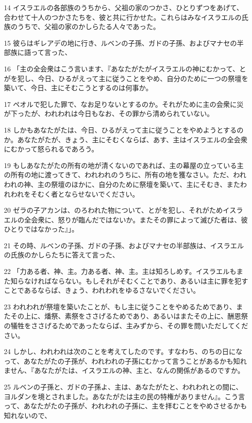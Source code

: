 \par 14 イスラエルの各部族のうちから、父祖の家のつかさ、ひとりずつをあげて、合わせて十人のつかさたちを、彼と共に行かせた。これらはみなイスラエルの氏族のうちで、父祖の家のかしらたる人々であった。
\par 15 彼らはギレアデの地に行き、ルベンの子孫、ガドの子孫、およびマナセの半部族に語って言った、
\par 16 「主の全会衆はこう言います、『あなたがたがイスラエルの神にむかって、とがを犯し、今日、ひるがえって主に従うことをやめ、自分のために一つの祭壇を築いて、今日、主にそむこうとするのは何事か。
\par 17 ペオルで犯した罪で、なお足りないとするのか。それがために主の会衆に災が下ったが、われわれは今日もなお、その罪から清められていない。
\par 18 しかもあなたがたは、今日、ひるがえって主に従うことをやめようとするのか。あなたがたが、きょう、主にそむくならば、あす、主はイスラエルの全会衆にむかって怒られるであろう。
\par 19 もしあなたがたの所有の地が清くないのであれば、主の幕屋の立っている主の所有の地に渡ってきて、われわれのうちに、所有の地を獲なさい。ただ、われわれの神、主の祭壇のほかに、自分のために祭壇を築いて、主にそむき、またわれわれをそむく者とならせないでください。
\par 20 ゼラの子アカンは、のろわれた物について、とがを犯し、それがためイスラエルの全会衆に、怒りが臨んだではないか。またその罪によって滅びた者は、彼ひとりではなかった』」。
\par 21 その時、ルベンの子孫、ガドの子孫、およびマナセの半部族は、イスラエルの氏族のかしらたちに答えて言った、
\par 22 「力ある者、神、主。力ある者、神、主。主は知ろしめす。イスラエルもまた知らなければならない。もしそれがそむくことであり、あるいは主に罪を犯すことであるならば、きょう、われわれをゆるさないでください。
\par 23 われわれが祭壇を築いたことが、もし主に従うことをやめるためであり、またその上に、燔祭、素祭をささげるためであり、あるいはまたその上に、酬恩祭の犠牲をささげるためであったならば、主みずから、その罪を問いただしてください。
\par 24 しかし、われわれは次のことを考えてしたのです。すなわち、のちの日になって、あなたがたの子孫が、われわれの子孫にむかって言うことがあるかも知れません、『あなたがたは、イスラエルの神、主と、なんの関係があるのですか。
\par 25 ルベンの子孫と、ガドの子孫よ、主は、あなたがたと、われわれとの間に、ヨルダンを境とされました。あなたがたは主の民の特権がありません』。こう言って、あなたがたの子孫が、われわれの子孫に、主を拝むことをやめさせるかも知れないので、

